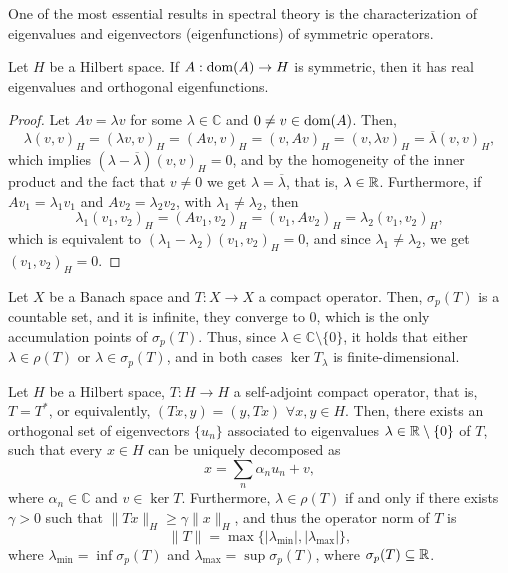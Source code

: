 One of the most essential results in spectral theory is the characterization of eigenvalues and eigenvectors (eigenfunctions) of symmetric operators. 
\begin{theorem}\label{thm:eigenvalues-symmetric}
    Let $H$ be a Hilbert space. If $A:\operatorname{\text{dom}}(A)\to H$ is symmetric, then it has real eigenvalues and orthogonal eigenfunctions. 
    \begin{proof}
        Let $Av=\lambda v$ for some $\lambda\in\mathbb{C}$ and $0\neq v\in\operatorname{\text{dom}}(A)$. Then, 
        \begin{equation*}
            \lambda(v,v)_H = (\lambda v, v)_H = (Av,v)_H = (v,Av)_H = (v,\lambda v)_H = \overline{\lambda}(v,v)_H,
        \end{equation*}
        which implies $(\lambda-\overline{\lambda})(v,v)_H=0$, and by the homogeneity of the inner product and the fact that $v\neq 0$ we get $\lambda=\overline{\lambda}$, that is, $\lambda\in\mathbb{R}$. Furthermore, if $Av_1=\lambda_1v_1$ and $Av_2=\lambda_2v_2$, with $\lambda_1\neq\lambda_2$, then 
        \begin{equation*}
            \lambda_1(v_1,v_2)_H = (Av_1,v_2)_H = (v_1,Av_2)_H = \lambda_2(v_1,v_2)_H,
        \end{equation*}
        which is equivalent to $(\lambda_1-\lambda_2)(v_1,v_2)_H = 0$, and since $\lambda_1\neq\lambda_2$, we get $(v_1,v_2)_H = 0$.
    \end{proof}
\end{theorem}
\begin{theorem}\label{thm:spectral-compact}
    Let $X$ be a Banach space and $T:X\to X$ a compact operator. Then, $\sigma_p(T)$ is a countable set, and it is infinite, they converge to $0$, which is the only accumulation points of $\sigma_p(T)$. Thus, since $\lambda\in\mathbb{C}\setminus\{0\}$, it holds that either $\lambda\in\rho(T)$ or $\lambda\in\sigma_p(T)$, and in both cases $\ker T_\lambda$ is finite-dimensional. 
\end{theorem}
\begin{theorem}\label{thm:hilbert-schmidt}
    Let $H$ be a Hilbert space, $T:H\to H$ a self-adjoint compact operator, that is, $T=T^*$, or equivalently, $(Tx,y)=(y,Tx)$ $\forall x,y\in H$. Then, there exists an orthogonal set of eigenvectors $\{u_n\}$ associated to eigenvalues $\lambda\in\mathbb{R}\setminus\{0\}$ of $T$, such that every $x\in H$ can be uniquely decomposed as 
    \begin{equation}
        x = \sum_n \alpha_n u_n + v,
    \end{equation}
    where $\alpha_n\in\mathbb{C}$ and $v\in\ker T$. Furthermore, $\lambda\in\rho(T)$ if and only if there exists $\gamma>0$ such that $\|Tx\|_H\geq \gamma\|x\|_H$, and thus the operator norm of $T$ is 
    \begin{equation}
        \|T\| = \max\{|\lambda_{\text{min}}|, |\lambda_{\text{max}}|\},
    \end{equation}
    where $\lambda_{\text{min}} = \inf \sigma_p(T)$ and $\lambda_{\text{max}} = \sup \sigma_p(T)$, where $\sigma_p(T)\subseteq\mathbb{R}$. 
\end{theorem}

